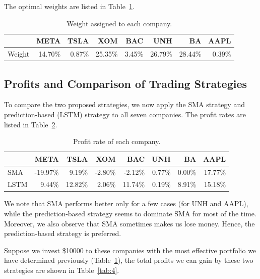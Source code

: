 \documentclass[a4paper, 11pt]{my-elegantpaper}
\begin{document}
The optimal weights are listed in Table~\ref{tab:2}.

\begin{table}[H]
    \centering
    \begin{tabular}{lrrrrrrr}
        \toprule
        {} &   META &  TSLA &    XOM &   BAC &    UNH &     BA &  AAPL \\
        \midrule
        Weight & 14.70\% & 0.87\% & 25.35\% & 3.45\% & 26.79\% & 28.44\% & 0.39\% \\
        \bottomrule
        \end{tabular}
    \caption{Weight assigned to each company.}
    \label{tab:2}
\end{table}


\subsection{Profits and Comparison of Trading Strategies}

To compare the two proposed strategies, we now apply the SMA strategy and prediction-based (LSTM) strategy to all seven companies. The profit rates are listed in Table~\ref{tab:3}.

\begin{table}[H]
    \centering
    \begin{tabular}{lrrrrrrr}
        \toprule
        {} &    META &   TSLA &    XOM &    BAC &   UNH &    BA &   AAPL \\
        \midrule
        SMA  & -19.97\% &  9.19\% & -2.80\% & -2.12\% & 0.77\% & 0.00\% & 17.77\% \\
        LSTM &   9.44\% & 12.82\% &  2.06\% & 11.74\% & 0.19\% & 8.91\% & 15.18\% \\
        \bottomrule
    \end{tabular}
    \caption{Profit rate of each company.}
    \label{tab:3}
\end{table}

We note that SMA performs better only for a few cases (for UNH and AAPL), while the prediction-based strategy seems to dominate SMA for most of the time. Moreover, we also observe that SMA sometimes makes us lose money. Hence, the prediction-based strategy is preferred.

Suppose we invest \$10000 to these companies with the most effective portfolio we have determined previously (Table~\ref{tab:2}), the total profits we can gain by these two strategies are shown in Table~\ref{tab:4}.
\end{document}
